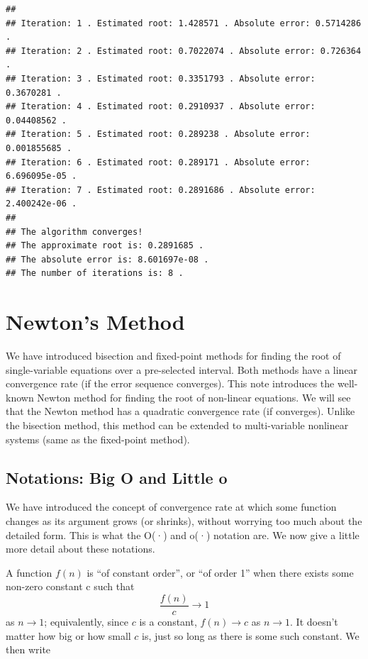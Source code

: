 \documentclass[
]{book}
\begin{document}
\begin{verbatim}
## 
## Iteration: 1 . Estimated root: 1.428571 . Absolute error: 0.5714286 .
## Iteration: 2 . Estimated root: 0.7022074 . Absolute error: 0.726364 .
## Iteration: 3 . Estimated root: 0.3351793 . Absolute error: 0.3670281 .
## Iteration: 4 . Estimated root: 0.2910937 . Absolute error: 0.04408562 .
## Iteration: 5 . Estimated root: 0.289238 . Absolute error: 0.001855685 .
## Iteration: 6 . Estimated root: 0.289171 . Absolute error: 6.696095e-05 .
## Iteration: 7 . Estimated root: 0.2891686 . Absolute error: 2.400242e-06 .
## 
## The algorithm converges!
## The approximate root is: 0.2891685 .
## The absolute error is: 8.601697e-08 .
## The number of iterations is: 8 .
\end{verbatim}

\hypertarget{newtons-method}{%
\chapter{Newton's Method}\label{newtons-method}}

We have introduced bisection and fixed-point methods for finding the root of single-variable equations over a pre-selected interval. Both methods have a linear convergence rate (if the error sequence converges). This note introduces the well-known Newton method for finding the root of non-linear equations. We will see that the Newton method has a quadratic convergence rate (if converges). Unlike the bisection method, this method can be extended to multi-variable nonlinear systems (same as the fixed-point method).

\hypertarget{notations-big-o-and-little-o}{%
\section{Notations: Big O and Little o}\label{notations-big-o-and-little-o}}

We have introduced the concept of convergence rate at which some function changes as its argument grows (or shrinks), without worrying too much about the detailed form. This is what the O(·) and o(·) notation are. We now give a little more detail about these notations.

A function \(f (n)\) is ``of constant order'', or ``of order 1'' when there exists some non-zero constant c such that
\[
\frac{f (n)}{c} \to 1
\]
as \(n \to 1\); equivalently, since \(c\) is a constant, \(f (n)\to c\) as \(n \to 1\). It doesn't matter how big or how small \(c\) is, just so long as there is some such constant. We then write
\end{document}
